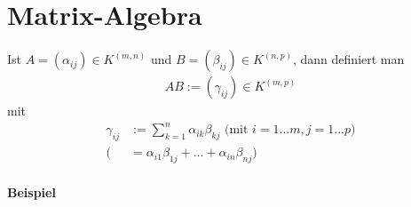 \documentclass[11pt]{report}
\begin{document}
\section{Matrix-Algebra}
Ist $A = (\alpha_{ij}) \in K^{(m,n)}$ und $B = (\beta_{ij}) \in K^{(n,p)}$, dann definiert man
\begin{align}
 AB := (\gamma_{ij}) \in K^{(m,p)}
\end{align}
mit 
\begin{align}
\gamma_{ij} &:= \sum_{k=1}^n \alpha_{ik} \beta_{kj} \text{ (mit } i=1...m, j=1...p) \\
(&= \alpha_{i1} \beta_{1j} + ... + \alpha_{in} \beta_{nj})
\end{align}
\newpage
\paragraph{Beispiel}
\end{document}
